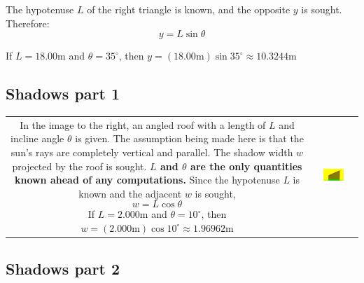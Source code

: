 \documentclass{article}
\begin{document}
The hypotenuse \(L\) of the right triangle is known, and the opposite \(y\) is sought. Therefore: 
\[y = L\sin\theta\]

If \(L = 18.00\text{m}\) and \(\theta = 35^\circ\), then \(y = (18.00\text{m})\sin 35^\circ \approx 10.3244\text{m}\)




\subsection*{Shadows part 1}

\begin{tabular}{cc}
\parbox{0.5\textwidth}{
In the image to the right, an angled roof with a length of \(L\) and incline angle \(\theta\) is given. The assumption being made here is that the sun's rays are completely vertical and parallel. The shadow width \(w\) projected by the roof is sought. {\bf \(L\) and \(\theta\) are the only quantities known ahead of any computations.} Since the hypotenuse \(L\) is known and the adjacent \(w\) is sought, 
\[w = L\cos\theta\]
If \(L = 2.000\text{m}\) and \(\theta = 10^\circ\), then \\ \(w = (2.000\text{m})\cos 10^\circ \approx 1.96962\text{m}\)
} & \parbox{0.5\textwidth}{
\includegraphics[width = 0.5\textwidth]{angled_roof_1}
} 
\end{tabular}



\subsection*{Shadows part 2}
\end{document}
